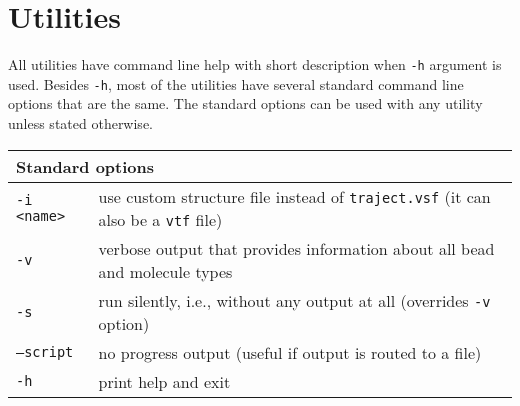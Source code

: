 \chapter{Utilities} \label{chap:Utils}

All utilities have command line help with short description when
\texttt{-h} argument is used. Besides \texttt{-h}, most of the utilities
have several standard command line options that are the same. The standard
options can be used with any utility unless stated otherwise.

\vspace{1em}
\noindent
\begin{tabular}{p{}p{}}
  \toprule
  \multicolumn{2}{l}{Standard options} \\
  \midrule
  \texttt{-i <name>} & use custom structure file instead of
    \texttt{traject.vsf} (it can also be a \texttt{vtf} file) \\
  \texttt{-v}        & verbose output that provides information about all
    bead and molecule types \\
  \texttt{-s}        & run silently, i.e., without any output at all
    (overrides \texttt{-v} option) \\
  \texttt{--script}  & no progress output (useful if output is routed to a
    file) \\
  \texttt{-h}        & print help and exit \\
  \bottomrule
\end{tabular}


























